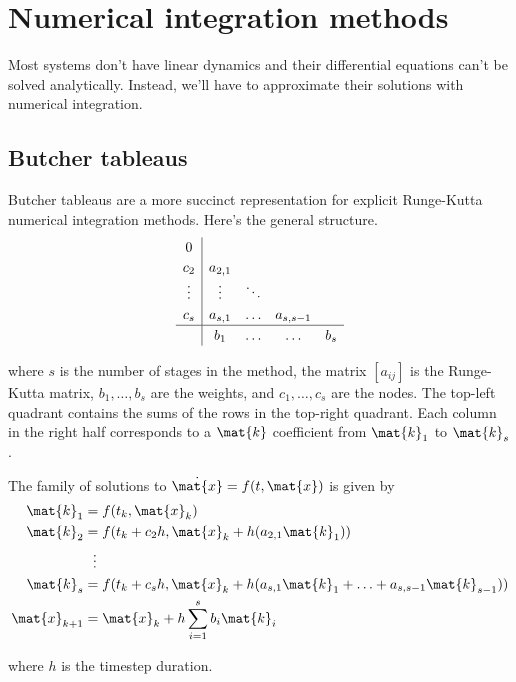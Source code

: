 \section{Numerical integration methods}

Most systems don't have linear dynamics and their differential equations can't
be solved analytically. Instead, we'll have to approximate their solutions with
numerical integration.

\subsection{Butcher tableaus}

Butcher tableaus are a more succinct representation for explicit Runge-Kutta
numerical integration methods. Here's the general structure.
\begin{equation*}
  \renewcommand\arraystretch{1.2}
  \begin{array}{c|cccc}
    0 \\
    c_2    & a_{2,1} \\
    \vdots & \vdots & \ddots \\
    c_s    & a_{s,1} & \hdots & a_{s,s-1} \\
    \hline
           & b_1    & \hdots & \hdots    & b_s
  \end{array}
\end{equation*}

where $s$ is the number of stages in the method, the matrix $[a_{ij}]$ is the
Runge-Kutta matrix, $b_1, \ldots, b_s$ are the weights, and $c_1, \ldots, c_s$
are the nodes. The top-left quadrant contains the sums of the rows in the
top-right quadrant. Each column in the right half corresponds to a $\mat{k}$
coefficient from $\mat{k}_1$ to $\mat{k}_s$.

The family of solutions to $\dot{\mat{x}} = f(t, \mat{x})$ is given by
\begin{align*}
  \mat{k}_1 &= f(t_k, \mat{x}_k) \\
  \mat{k}_2 &= f(t_k + c_2 h, \mat{x}_k + h (a_{2,1} \mat{k}_1)) \\
  &\ \ \vdots \\
  \mat{k}_s &= f(t_k + c_s h, \mat{x}_k +
    h (a_{s,1} \mat{k}_1 + \ldots + a_{s,s-1} \mat{k}_{s-1})) \\
  \mat{x}_{k+1} &= \mat{x}_k + h \sum_{i=1}^s b_i \mat{k}_i
\end{align*}

where $h$ is the timestep duration.

